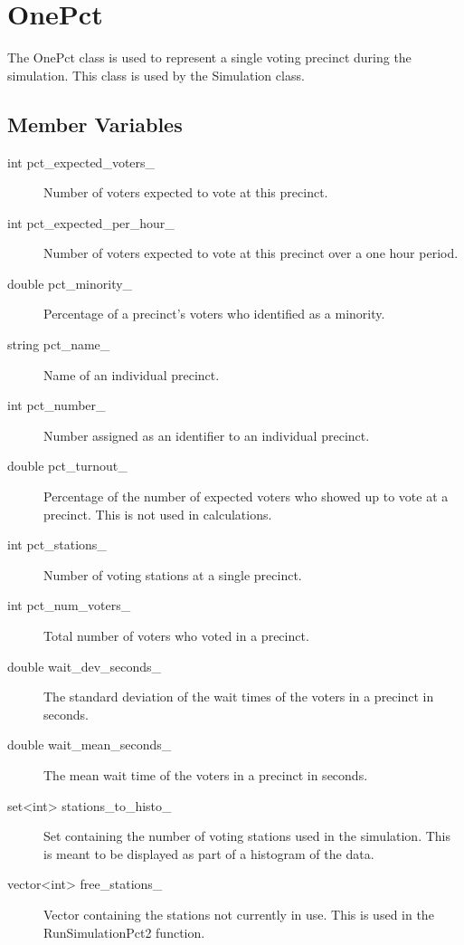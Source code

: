 %

\chapter{OnePct}
The OnePct class is used to represent a single voting precinct during the simulation.
This class is used by the Simulation class.

\section{Member Variables}

\begin{description}
\item[int pct_expected_voters_] Number of voters expected to vote at this precinct.
\item[int pct_expected_per_hour_] Number of voters expected to vote at this precinct over a one hour period.
\item[double pct_minority_] Percentage of a precinct's voters who identified as a minority.
\item[string pct_name_] Name of an individual precinct.
\item[int pct_number_] Number assigned as an identifier to an individual precinct.
\item[double pct_turnout_] Percentage of the number of expected voters who showed up to vote at a precinct.  This is not used in calculations.
\item[int pct_stations_] Number of voting stations at a single precinct.
\item[int pct_num_voters_]  Total number of voters who voted in a precinct.
\item[double wait_dev_seconds_] The standard deviation of the wait times of the voters in a precinct in seconds.
\item[double wait_mean_seconds_] The mean wait time of the voters in a precinct in seconds.
\item[set<int> stations_to_histo_] Set containing the number of voting stations used in the simulation.  This is meant to be displayed as part of a histogram of the data.
\item[vector<int> free_stations_] Vector containing the stations not currently in use.  This is used in the RunSimulationPct2 function.

\end{description}
